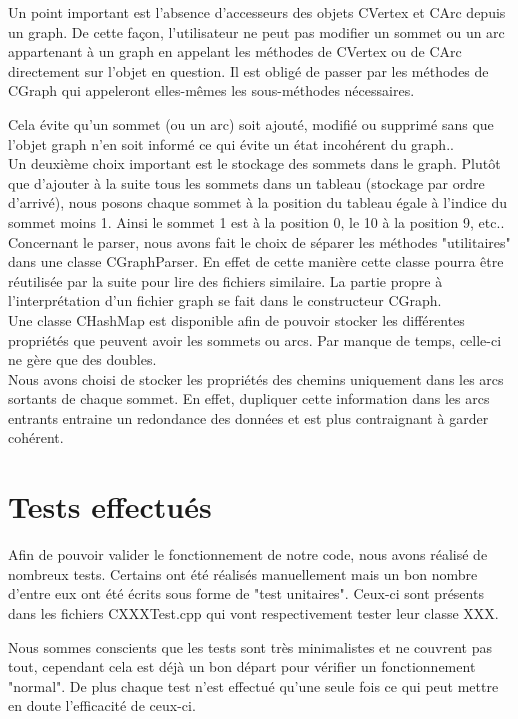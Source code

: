 		Un point important est l'absence d'accesseurs des objets CVertex et CArc depuis un graph. De cette façon, l'utilisateur ne peut pas modifier un sommet ou un arc appartenant à un graph en appelant les méthodes de CVertex ou de CArc directement sur l'objet en question. Il est obligé de passer par les méthodes de CGraph qui appeleront elles-mêmes les sous-méthodes nécessaires.
		
		Cela évite qu'un sommet (ou un arc) soit ajouté, modifié ou supprimé sans que l'objet graph n'en soit informé ce qui évite un état incohérent du graph..\\
		
		Un deuxième choix important est le stockage des sommets dans le graph. Plutôt que d'ajouter à la suite tous les sommets dans un tableau (stockage par ordre d'arrivé), nous posons chaque sommet à la position du tableau égale à l'indice du sommet moins 1. Ainsi le sommet 1 est à la position 0, le 10 à la position 9, etc..\\
		
	
		Concernant le parser, nous avons fait le choix de séparer les méthodes "utilitaires" dans une classe CGraphParser. En effet de cette manière cette classe pourra être réutilisée par la suite pour lire des fichiers similaire. La partie propre à l'interprétation d'un fichier graph se fait dans le constructeur CGraph.\\
		
		Une classe CHashMap est disponible afin de pouvoir stocker les différentes propriétés que peuvent avoir les sommets ou arcs. Par manque de temps, celle-ci ne gère que des doubles.\\
		
		Nous avons choisi de stocker les propriétés des chemins uniquement dans les arcs sortants de chaque sommet. En effet, dupliquer cette information dans les arcs entrants entraine un redondance des données et est plus contraignant à garder cohérent.
	\chapter{Tests effectués}
		Afin de pouvoir valider le fonctionnement de notre code, nous avons réalisé de nombreux tests. Certains ont été réalisés manuellement mais un bon nombre d'entre eux ont été écrits sous forme de "test unitaires". Ceux-ci sont présents dans les fichiers CXXXTest.cpp qui vont respectivement tester leur classe XXX.
		
		Nous sommes conscients que les tests sont très minimalistes et ne couvrent pas tout, cependant cela est déjà un bon départ pour vérifier un fonctionnement "normal". De plus chaque test n'est effectué qu'une seule fois ce qui peut mettre en doute l'efficacité de ceux-ci.
		
